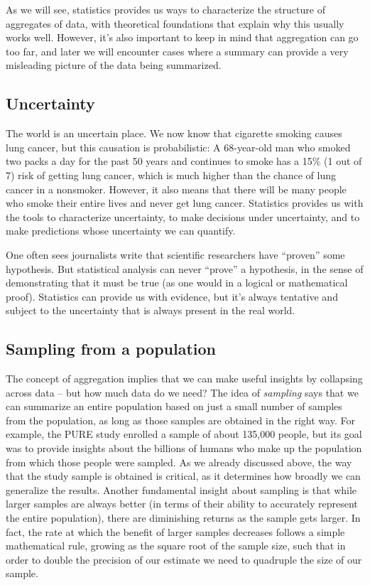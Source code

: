 \documentclass[
  12pt,
]{book}
\begin{document}
As we will see, statistics provides us ways to characterize the structure of aggregates of data, with theoretical foundations that explain why this usually works well. However, it's also important to keep in mind that aggregation can go too far, and later we will encounter cases where a summary can provide a very misleading picture of the data being summarized.

\hypertarget{uncertainty}{%
\subsection{Uncertainty}\label{uncertainty}}

The world is an uncertain place. We now know that cigarette smoking causes lung cancer, but this causation is probabilistic: A 68-year-old man who smoked two packs a day for the past 50 years and continues to smoke has a 15\% (1 out of 7) risk of getting lung cancer, which is much higher than the chance of lung cancer in a nonsmoker. However, it also means that there will be many people who smoke their entire lives and never get lung cancer. Statistics provides us with the tools to characterize uncertainty, to make decisions under uncertainty, and to make predictions whose uncertainty we can quantify.

One often sees journalists write that scientific researchers have ``proven'' some hypothesis. But statistical analysis can never ``prove'' a hypothesis, in the sense of demonstrating that it must be true (as one would in a logical or mathematical proof). Statistics can provide us with evidence, but it's always tentative and subject to the uncertainty that is always present in the real world.

\hypertarget{sampling-from-a-population}{%
\subsection{Sampling from a population}\label{sampling-from-a-population}}

The concept of aggregation implies that we can make useful insights by collapsing across data -- but how much data do we need? The idea of \emph{sampling} says that we can summarize an entire population based on just a small number of samples from the population, as long as those samples are obtained in the right way. For example, the PURE study enrolled a sample of about 135,000 people, but its goal was to provide insights about the billions of humans who make up the population from which those people were sampled. As we already discussed above, the way that the study sample is obtained is critical, as it determines how broadly we can generalize the results. Another fundamental insight about sampling is that while larger samples are always better (in terms of their ability to accurately represent the entire population), there are diminishing returns as the sample gets larger. In fact, the rate at which the benefit of larger samples decreases follows a simple mathematical rule, growing as the square root of the sample size, such that in order to double the precision of our estimate we need to quadruple the size of our sample.
\end{document}
